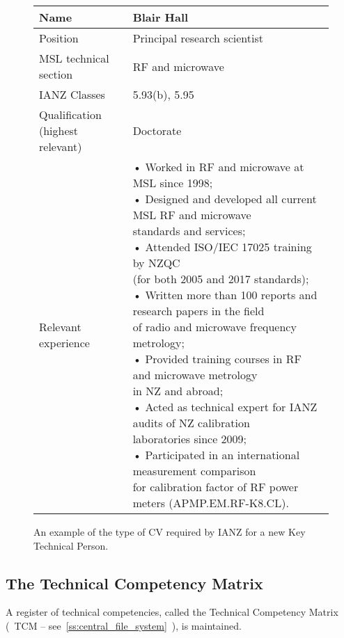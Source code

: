 \begin{figure}[ht]
\begin{center}
\begin{tabular}{|p{3.5cm}|p{10cm}|}
\hline 
\rule[-1ex]{0pt}{2.5ex} Name & Blair Hall \\ 
\hline 
\rule[-1ex]{0pt}{2.5ex} Position & Principal research scientist \\ 
\hline 
\rule[-1ex]{0pt}{2.5ex} MSL technical section & RF and microwave \\ 
\hline 
\rule[-1ex]{0pt}{2.5ex} IANZ Classes & 5.93(b), 5.95 \\ 
\hline 
\rule[-1ex]{0pt}{2.5ex} \makecell[tl]{ Qualification\\ (highest relevant)} & Doctorate \\ 
\hline 
\rule[-1ex]{0pt}{2.5ex} Relevant experience & \makecell[tl]{
• Worked in RF and microwave at MSL since 1998;\\
• Designed and developed all current MSL RF and microwave\\
 standards and services;\\
• Attended ISO/IEC 17025 training by NZQC\\ 
(for both 2005 and 2017 standards);\\
• Written more than 100 reports and research papers in the field\\ 
of radio and microwave frequency metrology;\\
• Provided training courses in RF and microwave metrology\\ 
in NZ and abroad;\\
• Acted as technical expert for IANZ audits of NZ calibration\\ 
laboratories since 2009;\\
• Participated in an international measurement comparison\\ 
for calibration factor of RF power meters (APMP.EM.RF-K8.CL).} \\ 
\hline 
\end{tabular} 
\end{center}
\caption{An example of the type of CV required by IANZ for a new Key Technical Person.}
\label{f:ktp_cv}
\end{figure}

\subsection{The Technical Competency Matrix}
A register of technical competencies, called the Technical Competency Matrix (~TCM -- see~\ref{ss:central_file_system}~), is maintained. 


